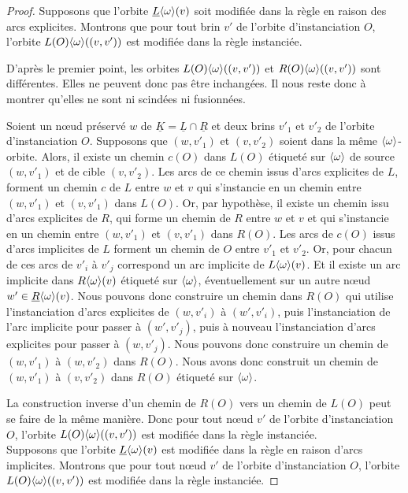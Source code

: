 \begin{proof}
	Supposons que l'orbite $\underline{L}\langle\omega\rangle(v)$ soit modifiée dans la règle en raison des arcs explicites. %
	Montrons que pour tout brin $v'$ de l'orbite d'instanciation $O$, l'orbite $L(O)\langle\omega\rangle((v, v'))$ est modifiée dans la règle instanciée. %

	D'après le premier point, les orbites $L(O)\langle\omega\rangle((v, v'))$ et $R(O)\langle\omega\rangle((v, v'))$ sont différentes. %
	Elles ne peuvent donc pas être inchangées. %
	Il nous reste donc à montrer qu'elles ne sont ni scindées ni fusionnées. %

	Soient un n\oe ud préservé $w$ de $\underline{K} = \underline{L} \cap \underline{R}$ et deux brins $v'_1$ et $v'_2$ de l'orbite d'instanciation $O$. %
	Supposons que $(w, v'_1)$ et $(v, v'_2)$ soient dans la même $\langle\omega\rangle$-orbite. %
	Alors, il existe un chemin $c(O)$ dans $L(O)$ étiqueté sur $\langle\omega\rangle$ de source $(w, v'_1)$ et de cible $(v, v'_2)$. %
	Les arcs de ce chemin issus d'arcs explicites de $L$, forment un chemin $c$ de $L$ entre $w$ et $v$ qui s'instancie en un chemin entre $(w, v'_1)$ et $(v, v'_1)$ dans $L(O)$. %
	Or, par hypothèse, il existe un chemin issu d'arcs explicites de $R$, qui forme un chemin de $R$ entre $w$ et $v$ et qui s'instancie en un chemin entre $(w, v'_1)$ et $(v, v'_1)$ dans $R(O)$. %
	Les arcs de $c(O)$ issus d'arcs implicites de $L$ forment un chemin de $O$ entre $v'_1$ et $v'_2$. %
	Or, pour chacun de ces arcs de $v'_i$ à $v'_j$ correspond un arc implicite de $L\langle\omega\rangle(v)$. Et il existe un arc implicite dans $R\langle\omega\rangle(v)$ étiqueté sur $\langle\omega\rangle$, éventuellement sur un autre n\oe ud $w' \in \underline{R}\langle\omega\rangle(v)$. %
	Nous pouvons donc construire un chemin dans $R(O)$ qui utilise l'instanciation d'arcs explicites de $(w, v'_i)$ à $(w', v'_i)$, puis l'instanciation de l'arc implicite pour passer à $(w', v'_j)$, puis à nouveau l'instanciation d'arcs explicites pour passer à $(w, v'_j)$. %
	Nous pouvons donc construire un chemin de $(w, v'_1)$ à $(w, v'_2)$ dans $R(O)$. %
	Nous avons donc construit un chemin de $(w, v'_1)$ à $(v, v'_2)$ dans $R(O)$ étiqueté sur $\langle\omega\rangle$.

	La construction inverse d'un chemin de $R(O)$ vers un chemin de $L(O)$ peut se faire de la même manière. %
	Donc pour tout n\oe ud $v'$ de l'orbite d'instanciation $O$, l'orbite $L(O)\langle\omega\rangle((v, v'))$ est modifiée dans la règle instanciée.
	\\ %

	Supposons que l'orbite $\underline{L}\langle\omega\rangle(v)$ est modifiée dans la règle en raison d'arcs implicites. %
	Montrons que pour tout n\oe ud $v'$ de l'orbite d'instanciation $O$, l'orbite $L(O)\langle\omega\rangle((v, v'))$ est modifiée dans la règle instanciée. %


\end{proof}
